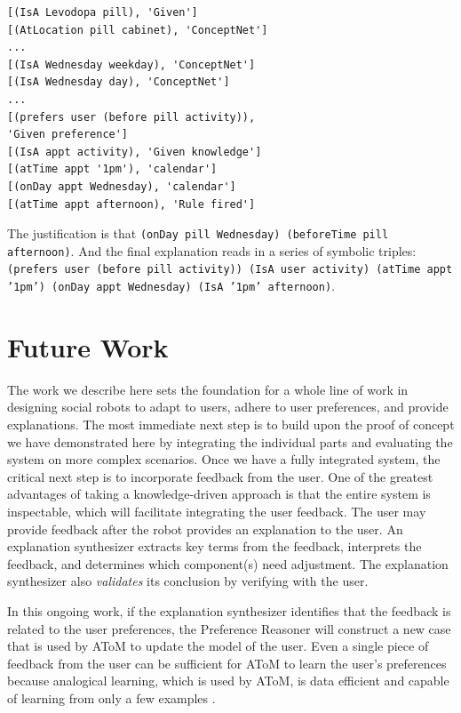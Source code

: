 \documentclass[letterpaper]{article} %
\begin{document}
\small{
\begin{verbatim}
[(IsA Levodopa pill), 'Given']
[(AtLocation pill cabinet), 'ConceptNet']
...
[(IsA Wednesday weekday), 'ConceptNet']
[(IsA Wednesday day), 'ConceptNet']
...
[(prefers user (before pill activity)),
'Given preference']
[(IsA appt activity), 'Given knowledge']
[(atTime appt '1pm'), 'calendar']
[(onDay appt Wednesday), 'calendar']
[(atTime appt afternoon), 'Rule fired']
\end{verbatim}}  The justification is that \texttt{(onDay pill Wednesday) (beforeTime pill
afternoon)}.  And the final explanation reads in a series of symbolic
triples: \texttt{(prefers user (before pill activity)) (IsA user activity) (atTime appt '1pm') (onDay appt Wednesday) (IsA '1pm' afternoon)}.

\vspace{-0.76mm}
\section{Future Work}
The work we describe here sets the foundation for a whole line of work in
designing social robots to adapt to users, adhere to user preferences, and
provide explanations.  The most immediate next step is to build upon the
proof of concept we have demonstrated here by integrating the individual
parts and evaluating the system on more complex scenarios.  Once we have a fully integrated system, the critical next step is to
incorporate feedback from the user.
One of the greatest advantages of taking a knowledge-driven approach is
that the entire system is inspectable, which will facilitate integrating
the user feedback.
The user may provide feedback after the robot provides an explanation to
the user.  An explanation synthesizer extracts key terms from the
feedback, interprets the feedback, and determines which component(s)
need adjustment.  The explanation synthesizer also \emph{validates} its
conclusion by verifying with the user.

In this ongoing work, if the explanation synthesizer identifies that the feedback is related
to the user preferences, the Preference Reasoner will construct a new
case that is used by AToM to update the model of the user.  Even a single
piece of feedback from the user can be sufficient for AToM to learn the
user's preferences because analogical learning, which is used by AToM, is
data efficient and capable of learning from only a few examples
\cite{chen2019human,wilson2019analogical}.


\vspace{-0.78mm}
\end{document}
